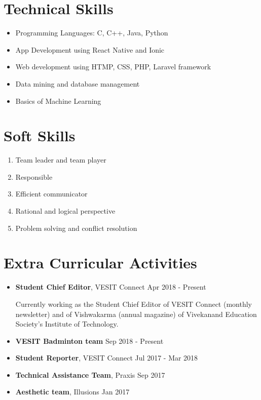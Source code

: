 \documentclass[margin]{res}
\begin{document}
\begin{resume}
\section{Technical Skills}
\begin{itemize}
  \item Programming Languages: C, C++, Java, Python
  \item App Development using React Native and Ionic
  \item Web development using HTMP, CSS, PHP, Laravel framework
  \item Data mining and database management
  \item Basics of Machine Learning
\end{itemize}

\section{Soft Skills}
\begin{enumerate}
  \item Team leader and team player
  \item Responsible
  \item Efficient communicator
  \item Rational and logical perspective
  \item Problem solving and conflict resolution
\end{enumerate}

\section{Extra Curricular Activities}
\begin{itemize}
  \item {\bf Student Chief Editor}, VESIT Connect \hfill Apr 2018 - Present
  
  Currently working as the Student Chief Editor of VESIT Connect (monthly newsletter) and of Vishwakarma (annual magazine)  of Vivekanand Education Society's Institute of Technology. 
  \item {\bf VESIT Badminton team} \hfill Sep 2018 - Present
  \item {\bf Student Reporter}, VESIT Connect \hfill Jul 2017 - Mar 2018
  \item {\bf Technical Assistance Team}, Praxis \hfill Sep 2017
  \item {\bf Aesthetic team}, Illusions \hfill Jan 2017
\end{itemize}


\end{resume}
\end{document}
